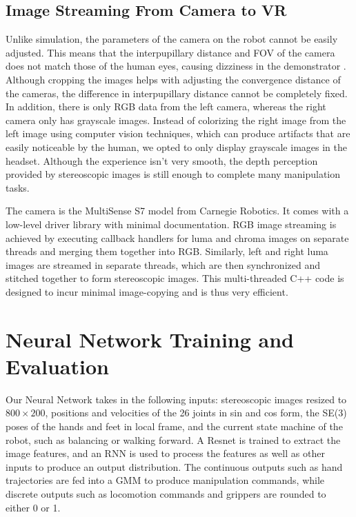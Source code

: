 \subsection{Image Streaming From Camera to VR}

Unlike simulation, the parameters of the camera on the robot cannot be easily adjusted. This means that the interpupillary distance and FOV of the camera does not match those of the human eyes, causing dizziness in the demonstrator \cite{distortion}. Although cropping the images helps with adjusting the convergence distance of the cameras, the difference in interpupillary distance cannot be completely fixed. In addition, there is only RGB data from the left camera, whereas the right camera only has grayscale images. Instead of colorizing the right image from the left image using computer vision techniques, which can produce artifacts that are easily noticeable by the human, we opted to only display grayscale images in the headset. Although the experience isn't very smooth, the depth perception provided by stereoscopic images is still enough to complete many manipulation tasks.

The camera is the MultiSense S7 model from Carnegie Robotics. It comes with a low-level driver library with minimal documentation. RGB image streaming is achieved by executing callback handlers for luma and chroma images on separate threads and merging them together into RGB. Similarly, left and right luma images are streamed in separate threads, which are then synchronized and stitched together to form stereoscopic images. This multi-threaded C++ code is designed to incur minimal image-copying and is thus very efficient.

\section{Neural Network Training and Evaluation}

Our Neural Network takes in the following inputs: stereoscopic images resized to $800\times 200$, positions and velocities of the 26 joints in sin and cos form, the SE(3) poses of the hands and feet in local frame, and the current state machine of the robot, such as balancing or walking forward. A Resnet is trained to extract the image features, and an RNN is used to process the features as well as other inputs to produce an output distribution. The continuous outputs such as hand trajectories are fed into a GMM to produce manipulation commands, while discrete outputs such as locomotion commands and grippers are rounded to either 0 or 1. 


